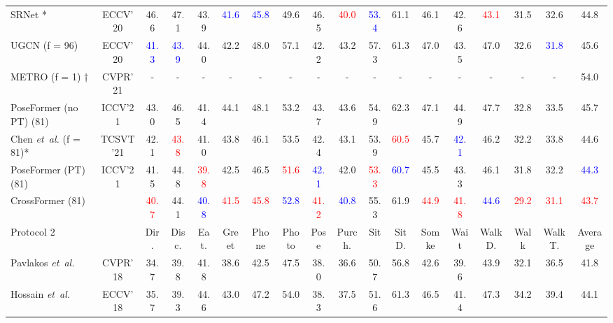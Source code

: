 \documentclass[runningheads]{llncs}
\newcommand{\latinphrase}[1]{\textit{#1}}
\newcommand{\etal}{\latinphrase{et~al.}\xspace}
\begin{document}
\begin{table*}[t]
{\begin{tabular}{l|c|ccccccccccccccc|c}
SRNet \cite{zeng2020srnet} * & ECCV\textquoteright 20  & 46.6  & 47.1  & 43.9  & \textcolor{blue}{41.6}  & \textcolor{blue}{45.8}  & 49.6  & 46.5  & \textcolor{red}{40.0}  &\textcolor{blue} {53.4}  & 61.1  & 46.1  & 42.6  & \textcolor{red}{43.1}  & 31.5  & 32.6  & 44.8\tabularnewline

 UGCN \cite{wang2020motion} (f = 96)& ECCV\textquoteright 20  & \textcolor{blue}{41.3}  & \textcolor{blue}{43.9}  & 44.0  & 42.2  & 48.0  & 57.1  & 42.2  & 43.2  & 57.3  & 61.3  & 47.0  & 43.5  & 47.0  & 32.6  & \textcolor{blue}{31.8}  & 45.6\tabularnewline


 METRO \cite{lin2021end} (f = 1) †  & CVPR\textquoteright 21 & - & - & - & - & - & - & - & - & - & - & - & - & - & - & - & 54.0\tabularnewline

PoseFormer (no PT) \cite{poseformer} (81) & ICCV'21 & 43.0  & 46.5  & 41.4  & 44.1  & 48.1 & 53.2  & 43.7  & 43.6 & 54.9  & 62.3  & 47.1  & 44.9  & 47.7  & 32.8 & 33.5  & 45.7\tabularnewline

Chen \etal \cite{chen2021anatomy} (f = 81)* & TCSVT\textquoteright 21  & 42.1  &\textcolor{red}{ 43.8}  & 41.0  & 43.8  & 46.1  & 53.5  & 42.4  & 43.1  & 53.9  & \textcolor{red}{60.5}  & 45.7  & \textcolor{blue}{42.1}  & 46.2  & 32.2  & 33.8  & 44.6\tabularnewline
PoseFormer (PT)\cite{poseformer} (81) & ICCV'21 & 41.5  & 44.8  & \textcolor{red}{39.8}  & 42.5  & 46.5 & \textcolor{red}{51.6}  & \textcolor{blue}{42.1}  & 42.0 & \textcolor{red}{53.3}  & \textcolor{blue}{60.7}  & 45.5  & 43.3  & 46.1  & 31.8 & 32.2  & \textcolor{blue}{44.3}\tabularnewline
\hline
CrossFormer (81) &  & \textcolor{red}{40.7} & 44.1  & \textcolor{blue}{40.8}  & \textcolor{red}{41.5}  & \textcolor{red}{45.8} & \textcolor{blue}{52.8}  & \textcolor{red}{41.2}  & \textcolor{blue}{40.8} & 55.3  & 61.9  & \textcolor{red}{44.9}  & \textcolor{red}{41.8}  & \textcolor{blue}{44.6}  & \textcolor{red}{29.2} & \textcolor{red}{31.1}  & \textcolor{red}{43.7}\tabularnewline
\hline

Protocol 2 &  & Dir.  & Disc.  & Eat.  & Greet  & Phone  & Photo  & Pose  & Purch.  & Sit  & SitD.  & Somke  & Wait  & WalkD.  & Walk  & WalkT.  & Average\tabularnewline
\hline
 Pavlakos \etal \cite{pavlakos2018ordinal}
& CVPR\textquoteright 18 & 34.7  & 39.8  & 41.8  & 38.6  & 42.5  & 47.5  & 38.0  & 36.6  & 50.7  & 56.8  & 42.6  & 39.6  & 43.9  & 32.1  & 36.5  & 41.8\tabularnewline

 Hossain \etal \cite{} 
& ECCV\textquoteright 18  & 35.7  & 39.3  & 44.6  & 43.0  & 47.2  & 54.0  & 38.3  & 37.5  & 51.6  & 61.3  & 46.5  & 41.4  & 47.3  & 34.2  & 39.4  & 44.1\tabularnewline


\end{tabular}}
\end{table*}
\end{document}
